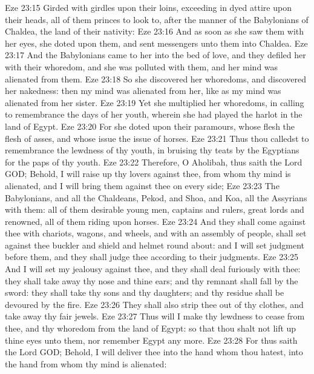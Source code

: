 \vs Eze 23:15 Girded with girdles upon their loins, exceeding in dyed attire upon their heads, all of them princes to look to, after the manner of the Babylonians of Chaldea, the land of their nativity:
\vs Eze 23:16 And as soon as she saw them with her eyes, she doted upon them, and sent messengers unto them into Chaldea.
\vs Eze 23:17 And the Babylonians came to her into the bed of love, and they defiled her with their whoredom, and she was polluted with them, and her mind was alienated from them.
\vs Eze 23:18 So she discovered her whoredoms, and discovered her nakedness: then my mind was alienated from her, like as my mind was alienated from her sister.
\vs Eze 23:19 Yet she multiplied her whoredoms, in calling to remembrance the days of her youth, wherein she had played the harlot in the land of Egypt.
\vs Eze 23:20 For she doted upon their paramours, whose flesh  the flesh of asses, and whose issue  the issue of horses.
\vs Eze 23:21 Thus thou calledst to remembrance the lewdness of thy youth, in bruising thy teats by the Egyptians for the paps of thy youth.
\vs Eze 23:22 Therefore, O Aholibah, thus saith the Lord GOD; Behold, I will raise up thy lovers against thee, from whom thy mind is alienated, and I will bring them against thee on every side;
\vs Eze 23:23 The Babylonians, and all the Chaldeans, Pekod, and Shoa, and Koa,  all the Assyrians with them: all of them desirable young men, captains and rulers, great lords and renowned, all of them riding upon horses.
\vs Eze 23:24 And they shall come against thee with chariots, wagons, and wheels, and with an assembly of people,  shall set against thee buckler and shield and helmet round about: and I will set judgment before them, and they shall judge thee according to their judgments.
\vs Eze 23:25 And I will set my jealousy against thee, and they shall deal furiously with thee: they shall take away thy nose and thine ears; and thy remnant shall fall by the sword: they shall take thy sons and thy daughters; and thy residue shall be devoured by the fire.
\vs Eze 23:26 They shall also strip thee out of thy clothes, and take away thy fair jewels.
\vs Eze 23:27 Thus will I make thy lewdness to cease from thee, and thy whoredom  from the land of Egypt: so that thou shalt not lift up thine eyes unto them, nor remember Egypt any more.
\vs Eze 23:28 For thus saith the Lord GOD; Behold, I will deliver thee into the hand  whom thou hatest, into the hand  from whom thy mind is alienated:
